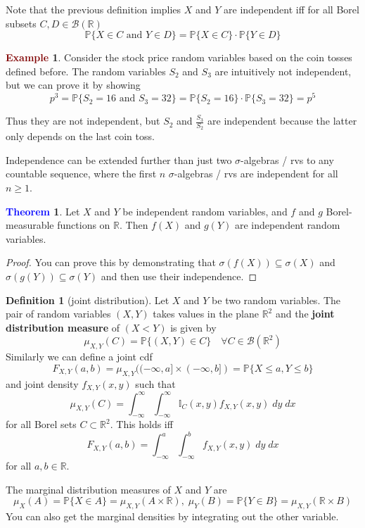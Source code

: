 \documentclass[11pt]{article}
\theoremstyle{definition}
\theoremstyle{definition}
\newcommand{\R}[0]{\mathbb{R}}
\newtheorem{theorem}{\textcolor{blue}{Theorem}}
\theoremstyle{definition}
\newtheorem{definition}{\textcolor{OliveGreen}{Definition}}
\newtheorem{ex}{\textcolor{Maroon}{Example}}
\theoremstyle{remark}
\begin{document}
Note that the previous definition implies $X$ and $Y$ are independent iff for all Borel subsets $C, D \in \mathcal{B}(\R)$ 
\[
    \mathbb{P}\{X \in C \text{ and } Y \in D\} = \mathbb{P}\{X \in C\} \cdot \mathbb{P}\{Y \in D\}
\]   

\begin{ex}
    Consider the stock price random variables based on the coin tosses defined before. The random variables
    $S_2$ and $S_3$ are intuitively not independent, but we can prove it by showing
    \[
        p^3 = \mathbb{P}\{S_2 = 16 \text{ and } S_3 = 32\} = \mathbb{P}\{S_2 = 16\} \cdot \mathbb{P}\{S_3 = 32\} = p^5
    \]  

    Thus they are not independent, but $S_2$ and $\frac{S_3}{S_2}$ are independent because the latter only depends on the
    last coin toss.  
\end{ex}

Independence can be extended further than just two $\sigma$-algebras / rvs to any countable sequence, where 
the first $n$ $\sigma$-algebras / rvs are independent for all $n \geq 1$.

\begin{theorem}
    Let $X$ and $Y$ be independent random variables, and $f$ and $g$ Borel-measurable functions on $\R$. Then
    $f(X)$ and $g(Y)$ are independent random variables.      
\end{theorem}
\begin{proof}
    You can prove this by demonstrating that $\sigma(f(X)) \subseteq \sigma(X)$ and $\sigma(g(Y)) \subseteq \sigma(Y)$
    and then use their independence.  
\end{proof}

\begin{definition}[joint distribution]
    Let $X$ and $Y$ be two random variables. The pair of random variables $(X, Y)$ takes values in the plane
    $\R^2$ and the \textbf{joint distribution measure} of $(X< Y)$ is given by
    \[
        \mu_{X, Y}(C) = \mathbb{P}\{(X, Y) \in C\} \quad \forall C \in \mathcal{B}(\R^2)
    \]     
    Similarly we can define a joint cdf
    \[
        F_{X, Y}(a, b) = \mu_{X, Y}((-\infty, a] \times (-\infty, b]) = \mathbb{P}\{X \leq a, Y \leq b\}
    \] 
    and joint density $f_{X, Y}(x, y)$ such that
    \[
        \mu_{X, Y}(C) = \int_{-\infty}^\infty \int_{-\infty}^\infty \mathbb{I}_C (x, y) f_{X, Y}(x, y) \; dy \; dx
    \]  
    for all Borel sets $C \subset \R^2$. This holds iff
    \[
        F_{X, Y}(a, b) = \int_{-\infty}^a \int_{-\infty}^b f_{X, Y}(x, y) \; dy \; dx
    \] 
    for all $a, b \in \R$.
    
    The marginal distribution measures of $X$ and $Y$ are 
    \[
        \mu_X(A) = \mathbb{P}\{X \in A\} = \mu_{X, Y}(A \times \R), \; \mu_Y(B) = \mathbb{P}\{Y \in B\} = \mu_{X, Y}(\R \times B)
    \]   
    You can also get the marginal densities by integrating out the other variable.
\end{definition}
\end{document}
